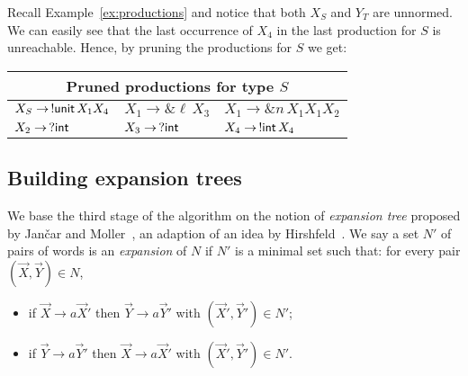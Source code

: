 \begin{example}
  \label{ex:prune}
  Recall Example~\ref{ex:productions} and notice that both
  $X_S$ and
  $Y_T$ are unnormed. We can easily see that the last occurrence of
  $X_4$ in the last production for
  $S$ is unreachable. Hence, by pruning the productions for
  $S$ we get:
  \begin{center}
    \begin{tabular}{l l l}
      \multicolumn{3}{c}{Pruned productions for type $S$}\\ \hline
      $X_S \rightarrow \,!\mathsf{unit}\, X_1 X_4$ &
      $X_1 \rightarrow \& \ell\, X_3$  &
      $X_1 \rightarrow \& n\, X_1 X_1 X_2$
      \\
      $X_2 \rightarrow \,? \mathsf{int}$ &
      $X_3 \rightarrow \,? \mathsf{int}$ &
      $X_4 \rightarrow \,!\mathsf{int}\, X_4$
    \end{tabular}
  \end{center}
\end{example}

\subsection{Building expansion trees}
\label{subsec:expand}


We base the third stage of the algorithm on the notion of
\emph{expansion tree} proposed by Jan{\v{c}}ar and
Moller~\cite{janvcar1999techniques}, an adaption of an idea by
Hirshfeld~\cite{hirshfeld1996bisimulation}. We say a set $N'$ of pairs
of words is an \emph{expansion} of $N$ if $N'$ is a minimal set such
that: for every pair $(\vec X, \vec Y) \in N$,
\begin{itemize}
\item if $\vec X \rightarrow a\vec X'$ then
  $\vec Y \rightarrow a\vec Y'$ with $(\vec X',\vec Y')\in N'$;
\item if $\vec Y \rightarrow a\vec Y'$ then
  $\vec X \rightarrow a \vec X'$ with $(\vec X',\vec Y')\in N'$.
\end{itemize}

